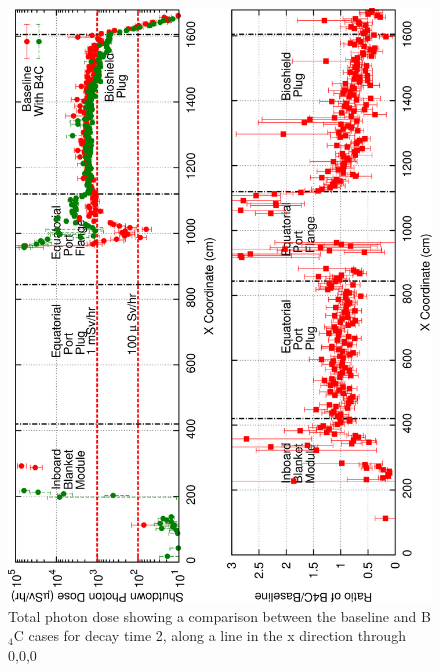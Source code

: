 \documentclass[12pt]{article}
\begin{document}
\begin{figure}[ht!]
\centering
\includegraphics[angle=-90,clip,scale=0.15]{../plots/photon_lineout/dc2_z0_lineout.png}
\caption{Total photon dose showing a comparison between the baseline and B$_4$C cases for decay time 2,
         along a line in the x direction through 0,0,0}
\label{fig:photons_dc2_total_dose_lineout}
\end{figure}
\end{document}
